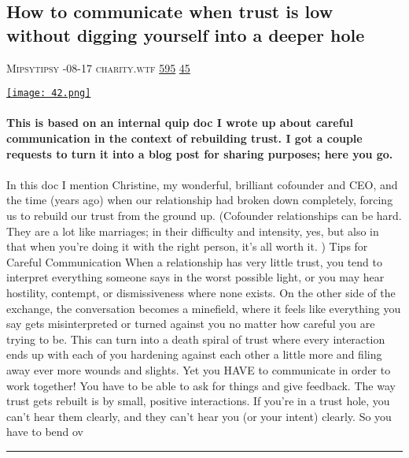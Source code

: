 \documentclass[10pt,a4paper]{article}
\begin{document}
\begin{multicols*}{2}
\begin{minipage}{\linewidth}
\subsection{How to communicate when trust is low without digging yourself into a deeper hole}
\textsc{\footnotesize
{\scriptsize\faUser}\space 
Mipsytipsy 
{\scriptsize\faCalendar}-08-17 
{\scriptsize\faGlobe}\space 
charity.wtf 
{\scriptsize\faThumbsOUp}\space 
\href{http://news.ycombinator.com/item?id=37166946\&utm\_term=comment}{595} 
{\scriptsize\faComments}\space 
\href{http://news.ycombinator.com/item?id=37166946\&utm\_term=comment}{45} 
}
\par\medskip\noindent
\href{https://charity.wtf/2023/08/17/how-to-communicate-when-trust-is-low-without-digging-yourself-into-a-deeper-hole/?utm\_source=hackernewsletter\&utm\_medium=email\&utm\_term=working}{
    \texttt{[image: 42.png]}
}
\end{minipage}
\paragraph{}
\textbf{This is based on an internal quip doc I wrote up about careful communication in the context of rebuilding trust. I got a couple requests to turn it into a blog post for sharing purposes; here you go.}
\paragraph{}

In this doc I mention Christine, my wonderful, brilliant cofounder and CEO, and the time (years ago) when our relationship had broken down completely, forcing us to rebuild our trust from the ground up.
(Cofounder relationships can be hard. They are a lot like marriages; in their difficulty and intensity, yes, but also in that when you’re doing it with the right person, it’s all worth it. )
Tips for Careful Communication
When a relationship has very little trust, you tend to interpret everything someone says in the worst possible light, or you may hear hostility, contempt, or dismissiveness where none exists. On the other side of the exchange, the conversation becomes a minefield, where it feels like everything you say gets misinterpreted or turned against you no matter how careful you are trying to be. This can turn into a death spiral of trust where every interaction ends up with each of you hardening against each other a little more and filing away ever more wounds and slights. 
Yet you HAVE to communicate in order to work together! You have to be able to ask for things and give feedback.
The way trust gets rebuilt is by small, positive interactions. If you’re in a trust hole, you can’t hear them clearly, and they can’t hear you (or your intent) clearly. So you have to bend ov
\par\noindent\textcolor{red}{\rule{\linewidth}{0.2mm}}
\vfill
\null
\noindent\begin{minipage}{\linewidth}

\end{minipage}
\end{multicols*}
\end{document}
